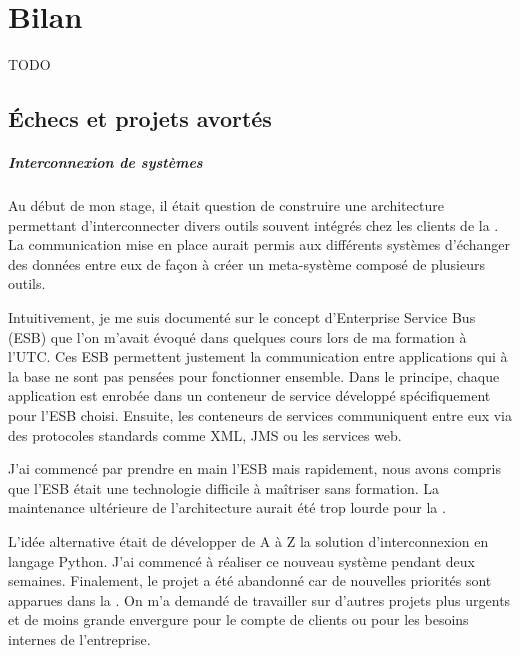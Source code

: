 \chapter{Bilan}

TODO



\section{Échecs et projets avortés}
\label{section:avortes}

\paragraph{Interconnexion de systèmes}
Au début de mon stage, il était question de construire une architecture permettant d'interconnecter divers outils souvent intégrés chez les clients de la \abusys.
La communication mise en place aurait permis aux différents systèmes d'échanger des données entre eux de façon à créer un \og meta-système \fg composé de plusieurs outils.

Intuitivement, je me suis documenté sur le concept d'Enterprise Service Bus (ESB) que l'on m'avait évoqué dans quelques cours lors de ma formation à l'UTC.
Ces ESB permettent justement la communication entre applications qui à la base ne sont pas pensées pour fonctionner ensemble.
Dans le principe, chaque application est enrobée dans un conteneur de service développé spécifiquement pour l'ESB choisi.
Ensuite, les conteneurs de services communiquent entre eux via des protocoles standards comme XML, JMS ou les services web.

J'ai commencé par prendre en main l'ESB \apetals{} mais rapidement, nous avons compris que l'ESB était une technologie difficile à maîtriser sans formation.
La maintenance ultérieure de l'architecture aurait été trop lourde pour la \abusys.

L'idée alternative était de développer de A à Z la solution d'interconnexion en langage Python.
J'ai commencé à réaliser ce nouveau système pendant deux semaines.
Finalement, le projet a été abandonné car de nouvelles priorités sont apparues dans la \abusys.
On m'a demandé de travailler sur d'autres projets plus urgents et de moins grande envergure pour le compte de clients ou pour les besoins internes de l'entreprise.

